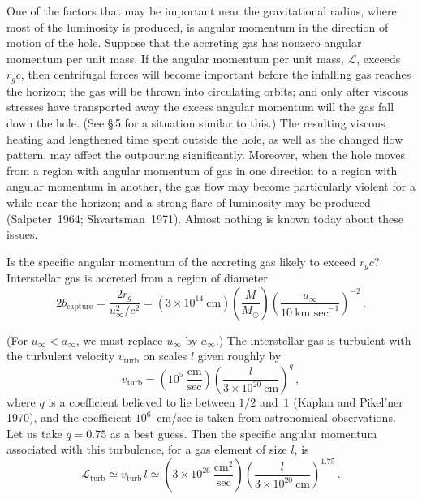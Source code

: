 One of the factors that may be important near the gravitational radius, where
most of the luminosity is produced, is angular momentum in the direction of motion
of the hole. Suppose that the accreting gas has nonzero angular momentum per
unit mass. If the angular momentum per unit mass, $\mathscr{L}$, exceeds
$r_g c$, then centrifugal forces will become important before the infalling gas reaches
the horizon; the gas will be thrown into circulating orbits; and only after viscous
stresses have transported away the excess angular momentum will the gas fall
down the hole. (See \S\,5 for a situation similar to this.) The resulting viscous
heating and lengthened time spent outside the hole, as well as the changed flow
pattern, may affect the outpouring significantly. Moreover, when the
hole moves from a region with angular momentum of gas in one direction to a
region with angular momentum in another, the gas flow may become particularly
violent for a while near the horizon; and a strong flare of luminosity may be
produced (Salpeter~1964; Shvartsman~1971)\cite{Salpeter1964,Shvartsman1971}. Almost nothing is known today
about these issues.

Is the specific angular momentum of the accreting gas likely to exceed $r_g c$?
Interstellar gas is accreted from a region of diameter
\begin{equation}
2b_\text{capture} = \frac{2r_g}{u_\infty^2/c^2}
= (3 \times 10^{14}~\text{cm})
\left(\frac{M}{M_\odot}\right)
\left(\frac{u_\infty}{10~\text{km~sec}^{-1}}\right)^{-2}\,.
\tag{4.8.7}
\end{equation}

(For $u_\infty < a_\infty$, we must replace $u_\infty$ by $a_\infty$.) The interstellar gas is turbulent with
the turbulent velocity $v_\text{turb}$ on scales $l$ given roughly by
\begin{equation}
v_\text{turb} = \left(10^5~\frac{\text{cm}}{\text{sec}}\right)
\left(\frac{l}{3 \times 10^{20}~\text{cm}}\right)^{q}\,,
\tag{4.8.8}
\end{equation}
where $q$ is a coefficient believed to lie between $1/2$ and~$1$ (Kaplan and Pikel'ner
1970)\cite{KaplanPikelner1970}, and the coefficient $10^6$~cm/sec is taken from astronomical observations.
Let us take $q = 0.75$ as a best guess. Then the specific angular momentum
associated with this turbulence, for a gas element of size $l$, is
\begin{equation}
\mathscr{L}_\text{turb} \simeq v_\text{turb}\, l
\simeq \left(3 \times 10^{26}~\frac{\text{cm}^2}{\text{sec}}\right)
\left(\frac{l}{3 \times 10^{20}~\text{cm}}\right)^{1.75}\,.
\tag{4.8.9}
\end{equation}

